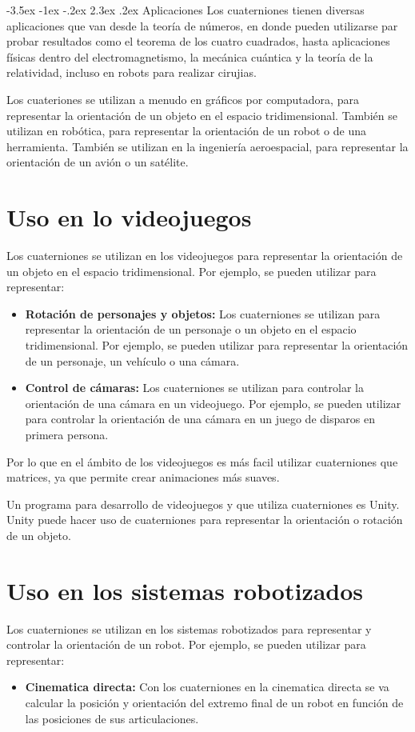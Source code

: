 \documentclass[11pt]{report}
\makeatletter
\renewcommand\chapter{\@startsection{chapter}{0}{\z@}%
    {-3.5ex \@plus -1ex \@minus -.2ex}%
    {2.3ex \@plus.2ex}%
    {\normalfont\Large\bfseries}}
\makeatother
\begin{document}
\newpage

\chapter{Aplicaciones}
Los cuaterniones tienen diversas aplicaciones que van desde la teoría de números, en donde pueden utilizarse par probar resultados como el teorema de los cuatro cuadrados,
hasta aplicaciones físicas dentro del electromagnetismo, la mecánica cuántica y la teoría de la relatividad, incluso en robots para realizar cirujias.

Los cuateriones se utilizan a menudo en gráficos por computadora, para representar la orientación de un objeto en el espacio tridimensional. También se utilizan en robótica,
para representar la orientación de un robot o de una herramienta. También se utilizan en la ingeniería aeroespacial, para representar la orientación de un avión o un satélite.

\section{Uso en lo videojuegos}
Los cuaterniones se utilizan en los videojuegos para representar la orientación de un objeto en el espacio tridimensional. Por ejemplo, se pueden utilizar para representar:
\begin{itemize}
  \item \textbf{Rotación de personajes y objetos: } Los cuaterniones se utilizan para representar la orientación de un personaje o un objeto en el espacio tridimensional.
        Por ejemplo, se pueden utilizar para representar la orientación de un personaje, un vehículo o una cámara.
  \item \textbf{Control de cámaras: } Los cuaterniones se utilizan para controlar la orientación de una cámara en un videojuego. Por ejemplo, se pueden utilizar para controlar
        la orientación de una cámara en un juego de disparos en primera persona.
\end{itemize}

Por lo que en el ámbito de los videojuegos es más facil utilizar cuaterniones que matrices, ya que permite crear animaciones más suaves.

Un programa para desarrollo de videojuegos y que utiliza cuaterniones es Unity.
Unity puede hacer uso de cuaterniones para representar la orientación o rotación de un objeto.

\section{Uso en los sistemas robotizados}
Los cuaterniones se utilizan en los sistemas robotizados para representar y controlar la orientación de un robot. Por ejemplo, se pueden utilizar para representar:
\begin{itemize}
  \item \textbf{Cinematica directa: } Con los cuaterniones en la cinematica directa se va calcular la posición y orientación del extremo final de un robot en función de las posiciones de sus
        articulaciones.
\end{itemize}
\end{document}
